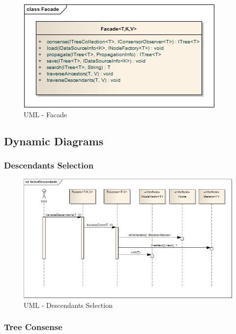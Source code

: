 \documentclass[a4paper,10pt]{article}
\begin{document}
  \begin{figure}
  \centering
  \includegraphics[scale=0.5]{images/Facade.jpg}  
  \caption{UML - Facade}
  \label{uml:Facade}
  \end{figure} 

   
 
 \subsection{Dynamic Diagrams}
 
 \subsubsection{Descendants Selection}
 
   \begin{figure}
  \centering
  \includegraphics[scale=0.5]{images/SelectDescendants.jpg}  
  \caption{UML - Descendants Selection}
  \label{uml:SelectDescendants}
  \end{figure} 

  
 \subsubsection{Tree Consense}
 
\end{document}
